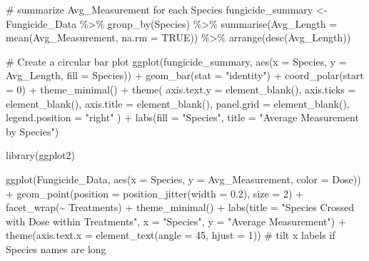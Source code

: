 \documentclass[
  10pt,
  letterpaper,
  twocolumn]{article}
\newenvironment{Shaded}{\begin{snugshade}}{\end{snugshade}}
\newcommand{\AttributeTok}[1]{\textcolor[rgb]{0.40,0.45,0.13}{#1}}
\newcommand{\CommentTok}[1]{\textcolor[rgb]{0.37,0.37,0.37}{#1}}
\newcommand{\ConstantTok}[1]{\textcolor[rgb]{0.56,0.35,0.01}{#1}}
\newcommand{\DecValTok}[1]{\textcolor[rgb]{0.68,0.00,0.00}{#1}}
\newcommand{\FloatTok}[1]{\textcolor[rgb]{0.68,0.00,0.00}{#1}}
\newcommand{\FunctionTok}[1]{\textcolor[rgb]{0.28,0.35,0.67}{#1}}
\newcommand{\NormalTok}[1]{\textcolor[rgb]{0.00,0.23,0.31}{#1}}
\newcommand{\OtherTok}[1]{\textcolor[rgb]{0.00,0.23,0.31}{#1}}
\newcommand{\SpecialCharTok}[1]{\textcolor[rgb]{0.37,0.37,0.37}{#1}}
\newcommand{\StringTok}[1]{\textcolor[rgb]{0.13,0.47,0.30}{#1}}
\begin{document}
\begin{Shaded}
\begin{Highlighting}[]
\CommentTok{\# summarize Avg\_Measurement for each Species}
\NormalTok{fungicide\_summary }\OtherTok{\textless{}{-}}\NormalTok{ Fungicide\_Data }\SpecialCharTok{\%\textgreater{}\%}
  \FunctionTok{group\_by}\NormalTok{(Species) }\SpecialCharTok{\%\textgreater{}\%}
  \FunctionTok{summarise}\NormalTok{(}\AttributeTok{Avg\_Length =} \FunctionTok{mean}\NormalTok{(Avg\_Measurement, }\AttributeTok{na.rm =} \ConstantTok{TRUE}\NormalTok{)) }\SpecialCharTok{\%\textgreater{}\%}
  \FunctionTok{arrange}\NormalTok{(}\FunctionTok{desc}\NormalTok{(Avg\_Length))}

\CommentTok{\# Create a circular bar plot}
\FunctionTok{ggplot}\NormalTok{(fungicide\_summary, }\FunctionTok{aes}\NormalTok{(}\AttributeTok{x =}\NormalTok{ Species, }\AttributeTok{y =}\NormalTok{ Avg\_Length, }\AttributeTok{fill =}\NormalTok{ Species)) }\SpecialCharTok{+}
  \FunctionTok{geom\_bar}\NormalTok{(}\AttributeTok{stat =} \StringTok{"identity"}\NormalTok{) }\SpecialCharTok{+}
  \FunctionTok{coord\_polar}\NormalTok{(}\AttributeTok{start =} \DecValTok{0}\NormalTok{) }\SpecialCharTok{+}
  \FunctionTok{theme\_minimal}\NormalTok{() }\SpecialCharTok{+}
  \FunctionTok{theme}\NormalTok{(}
    \AttributeTok{axis.text.y =} \FunctionTok{element\_blank}\NormalTok{(),}
    \AttributeTok{axis.ticks =} \FunctionTok{element\_blank}\NormalTok{(),}
    \AttributeTok{axis.title =} \FunctionTok{element\_blank}\NormalTok{(),}
    \AttributeTok{panel.grid =} \FunctionTok{element\_blank}\NormalTok{(),}
    \AttributeTok{legend.position =} \StringTok{"right"}
\NormalTok{  ) }\SpecialCharTok{+}
  \FunctionTok{labs}\NormalTok{(}\AttributeTok{fill =} \StringTok{"Species"}\NormalTok{, }\AttributeTok{title =} \StringTok{"Average Measurement by Species"}\NormalTok{)}

\FunctionTok{library}\NormalTok{(ggplot2)}

\FunctionTok{ggplot}\NormalTok{(Fungicide\_Data, }\FunctionTok{aes}\NormalTok{(}\AttributeTok{x =}\NormalTok{ Species, }\AttributeTok{y =}\NormalTok{ Avg\_Measurement, }\AttributeTok{color =}\NormalTok{ Dose)) }\SpecialCharTok{+}
  \FunctionTok{geom\_point}\NormalTok{(}\AttributeTok{position =} \FunctionTok{position\_jitter}\NormalTok{(}\AttributeTok{width =} \FloatTok{0.2}\NormalTok{), }\AttributeTok{size =} \DecValTok{2}\NormalTok{) }\SpecialCharTok{+}
  \FunctionTok{facet\_wrap}\NormalTok{(}\SpecialCharTok{\textasciitilde{}}\NormalTok{ Treatments) }\SpecialCharTok{+}
  \FunctionTok{theme\_minimal}\NormalTok{() }\SpecialCharTok{+}
  \FunctionTok{labs}\NormalTok{(}\AttributeTok{title =} \StringTok{"Species Crossed with Dose within Treatments"}\NormalTok{,}
       \AttributeTok{x =} \StringTok{"Species"}\NormalTok{,}
       \AttributeTok{y =} \StringTok{"Average Measurement"}\NormalTok{) }\SpecialCharTok{+}
  \FunctionTok{theme}\NormalTok{(}\AttributeTok{axis.text.x =} \FunctionTok{element\_text}\NormalTok{(}\AttributeTok{angle =} \DecValTok{45}\NormalTok{, }\AttributeTok{hjust =} \DecValTok{1}\NormalTok{)) }\CommentTok{\# tilt x labels if Species names are long}


\end{Highlighting}
\end{Shaded}
\end{document}
